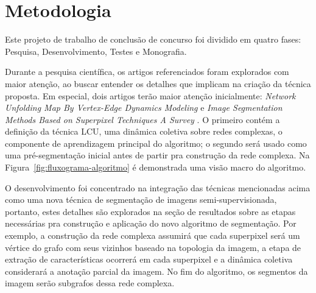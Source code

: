 \chapter{Metodologia}\label{cap:metodologia}


Este projeto de trabalho de conclusão de concurso foi dividido em quatro fases:
Pesquisa, Desenvolvimento, Testes e Monografia.

Durante a pesquisa científica, os artigos referenciados foram explorados com
maior atenção, ao buscar entender os detalhes que implicam
na criação da técnica proposta. Em especial, dois artigos terão maior
atenção inicialmente: \textit{Network Unfolding Map By Vertex-Edge
  Dynamics Modeling} \cite{VerriNetworkUnfoldingMap2018} e
\textit{Image Segmentation Methods Based on Superpixel Techniques A
  Survey} \cite{SuperpixelSurvey2020}. O primeiro contém a definição
da técnica LCU, uma dinâmica coletiva sobre redes complexas, o
componente de aprendizagem principal do algoritmo; o segundo será
usado como uma pré-segmentação inicial antes de partir pra construção
da rede complexa. Na Figura~\ref{fig:fluxograma-algoritmo} é demonstrada uma
visão macro do algoritmo.

\begin{figure}[!h]
        \captionsetup{width=8cm}
		\centering
\end{figure}


O desenvolvimento foi concentrado na integração das técnicas
mencionadas acima como uma nova técnica de segmentação de imagens
semi-supervisionada, portanto, estes detalhes são explorados na seção
de resultados sobre as etapas necessárias pra construção e aplicação
do novo algoritmo de segmentação. Por exemplo, a construção da rede
complexa assumirá que cada superpixel será um vértice do grafo com
seus vizinhos baseado na topologia da imagem, a etapa de extração de
características ocorrerá em cada superpixel e a dinâmica coletiva
considerará a anotação parcial da imagem. No fim do algoritmo, os
segmentos da imagem serão subgrafos dessa rede complexa.

